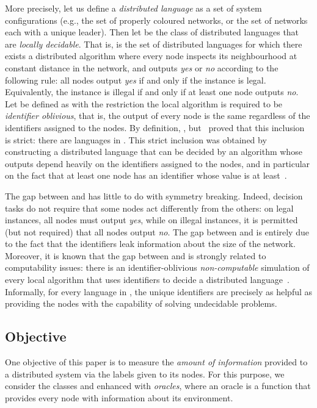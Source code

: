 \documentclass[11pt,a4paper]{article}
\theoremstyle{definition}
\theoremstyle{remark}
\begin{document}
More precisely, let us define a \emph{distributed language} as a set of system configurations (e.g., the set of properly coloured networks, or the set of networks each with a unique leader). Then let  be the class of distributed languages that are \emph{locally decidable}. That is,  is the set of distributed languages for which there exists a distributed algorithm where every node inspects its neighbourhood at constant distance in the network, and outputs \emph{yes} or \emph{no} according to the following rule:  all nodes output \emph{yes} if and only if the instance is legal. Equivalently, the instance is illegal if and only if at least one node outputs \emph{no}. Let  be defined as  with the restriction the local algorithm is required to be \emph{identifier oblivious}, that is, the output of every node is the same regardless of the identifiers assigned to the nodes. By definition, , but~\cite{fraigniaud13ld-id} proved that this inclusion is strict: there are languages in . This strict inclusion was obtained by constructing a distributed language that can be decided by an algorithm whose outputs depend heavily on the identifiers assigned to the nodes, and in particular on the fact that at least one node has an identifier whose value is at least~.

The gap between  and  has little to do with symmetry breaking. Indeed, decision tasks do not require that some nodes act differently from the others: on legal instances, all nodes must output \emph{yes}, while on illegal instances, it is permitted (but not required) that all nodes output \emph{no}. The gap between  and  is entirely due to the fact that the identifiers leak information about the size  of the network. Moreover, it is known that the gap between  and  is strongly related to computability issues: there is an identifier-oblivious \emph{non-computable} simulation  of every local algorithm  that uses identifiers to decide a distributed language~\cite{fraigniaud13ld-id}. Informally, for every language in , the unique identifiers are precisely as helpful as providing the nodes with the capability of solving undecidable problems.

\subsection{Objective}

One objective of this paper is to measure the \emph{amount of information} provided to a distributed system via the labels given to its nodes. For this purpose, we consider  the classes  and   enhanced with \emph{oracles}, where an oracle  is a function that provides every node with information about its environment.
\end{document}
